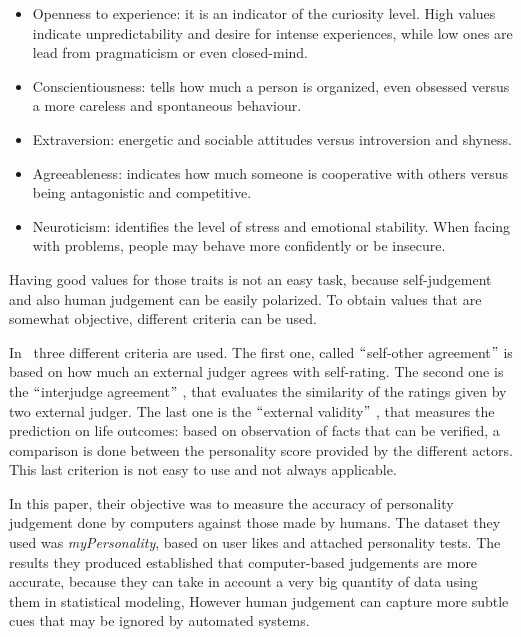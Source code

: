 \begin{itemize}
	\item Openness to experience: it is an indicator of the curiosity level. High values indicate unpredictability and desire for intense experiences, while low ones are lead from pragmaticism or even closed-mind.

	\item Conscientiousness: tells how much a person is organized, even obsessed versus a more careless and spontaneous behaviour.

	\item Extraversion: energetic and sociable attitudes versus introversion and shyness.

	\item Agreeableness: indicates how much someone is cooperative with others versus being antagonistic and competitive.

	\item Neuroticism: identifies the level of stress and emotional stability. When facing with problems, people may behave more confidently or be insecure.
\end{itemize}

Having good values for those traits is not an easy task, because self-judgement and also human judgement can be easily polarized. To obtain values that are somewhat objective, different criteria can be used.

In~\cite{youyou2015computer} three different criteria are used. The first one, called $``$self-other agreement$"$  is based on how much an external judger agrees with self-rating. The second one is the $``$interjudge agreement$"$ , that evaluates the similarity of the ratings given by two external judger. The last one is the $``$external validity$"$ , that measures the prediction on life outcomes: based on observation of facts that can be verified, a comparison is done between the personality score provided by the different actors. This last criterion is not easy to use and not always applicable.

In this paper, their objective was to measure the accuracy of personality judgement done by computers against those made by humans. The dataset they used was \textit{myPersonality}, based on user likes and attached personality tests. The results they produced established that computer-based judgements are more accurate, because they can take in account a very big quantity of data using them in statistical modeling, However human judgement can capture more subtle cues that may be ignored by automated systems.

